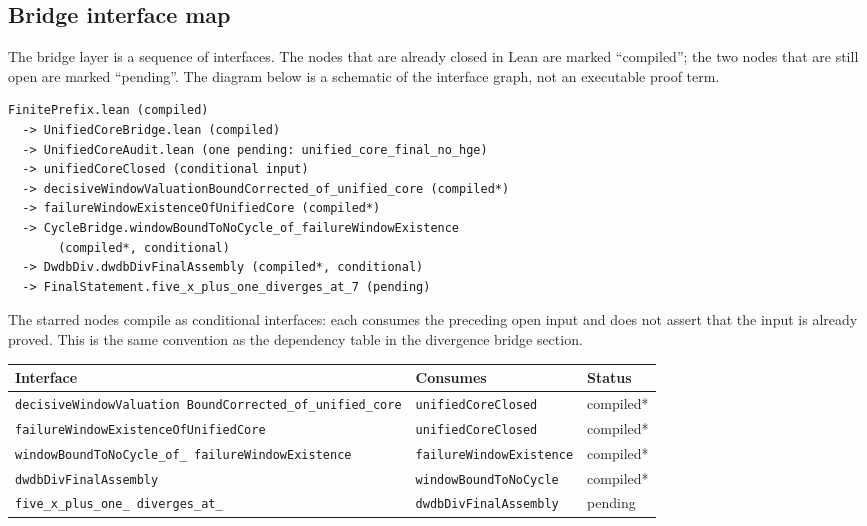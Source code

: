 \subsection{Bridge interface map}

The bridge layer is a sequence of interfaces.  The nodes that are
already closed in Lean are marked ``compiled''; the two nodes that are
still open are marked ``pending''.  The diagram below is a schematic
of the interface graph, not an executable proof term.

\begin{verbatim}
FinitePrefix.lean (compiled)
  -> UnifiedCoreBridge.lean (compiled)
  -> UnifiedCoreAudit.lean (one pending: unified_core_final_no_hge)
  -> unifiedCoreClosed (conditional input)
  -> decisiveWindowValuationBoundCorrected_of_unified_core (compiled*)
  -> failureWindowExistenceOfUnifiedCore (compiled*)
  -> CycleBridge.windowBoundToNoCycle_of_failureWindowExistence
       (compiled*, conditional)
  -> DwdbDiv.dwdbDivFinalAssembly (compiled*, conditional)
  -> FinalStatement.five_x_plus_one_diverges_at_7 (pending)
\end{verbatim}

The starred nodes compile as conditional interfaces: each consumes the
preceding open input and does not assert that the input is already
proved.  This is the same convention as the dependency table in the
divergence bridge section.

\begin{center}
\small
\begin{tabular}{@{}p{}p{}p{}@{}}
\toprule
Interface & Consumes & Status \\
\midrule
\texttt{decisiveWindowValuation\allowbreak
BoundCorrected\_\allowbreak of\_\allowbreak unified\_\allowbreak core}
& \texttt{unifiedCoreClosed} & compiled* \\
\texttt{failureWindowExistenceOfUnifiedCore} &
  \texttt{unifiedCoreClosed} & compiled* \\
\texttt{windowBoundToNoCycle\_\allowbreak of\_\allowbreak
failureWindowExistence} &
  \texttt{failureWindowExistence} & compiled* \\
\texttt{dwdbDivFinalAssembly} &
  \texttt{windowBoundToNoCycle} & compiled* \\
\texttt{five\_\allowbreak x\_\allowbreak plus\_\allowbreak one\_\allowbreak
diverges\_\allowbreak at\_\allowbreak 7} &
  \texttt{dwdbDivFinalAssembly} & pending \\
\bottomrule
\end{tabular}
\end{center}

